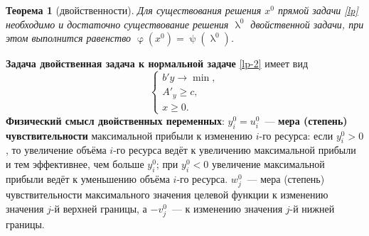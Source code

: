 \documentclass[a4paper, 12pt]{report}
\numberwithin{equation}{section}
\renewcommand{\geq}{\geqslant}
\renewcommand{\varphi}{\upvarphi}
\renewcommand{\lambda}{\uplambda}
\renewcommand{\psi}{\uppsi}
\newtheorem*{theorem}{Теорема}
\begin{document}
\begin{theorem}
    [двойственности]
    Для существования решения $x^0$ прямой задачи \eqref{lp} необходимо и достаточно существование решения $\lambda^0$ двойственной задачи, при этом выполнится равенство $\varphi(x^0) = \psi(\lambda^0)$.
\end{theorem}
\noindent
\textbf{Задача двойственная задача к нормальной задаче} \eqref{lp-2} имеет вид
\begin{equation}
\begin{cases}
     b' y \to \min,\\
    A'_y \geq c, \\ x \geq 0.   
\end{cases}
\end{equation}
\noindent
\textbf{Физический смысл двойственных переменных}: $y_i^0 = u_i^0$~--- \textbf{мера (степень) чувствительности} максимальной прибыли к изменению $i$-го ресурса: если $y_i^0 > 0$, то увеличение объёма $i$-го ресурса ведёт к увеличению максимальной прибыли и тем эффективнее, чем больше $y_i^0$; при $y_i^0 < 0$ увеличение максимальной прибыли ведёт к уменьшению объёма $i$-го ресурса. $w_j^0$~--- мера (степень) чувствительности максимального значения целевой функции к изменению значения $j$-й верхней границы, а $-v_j^0$~--- к изменению значения $j$-й нижней границы.
\end{document}
